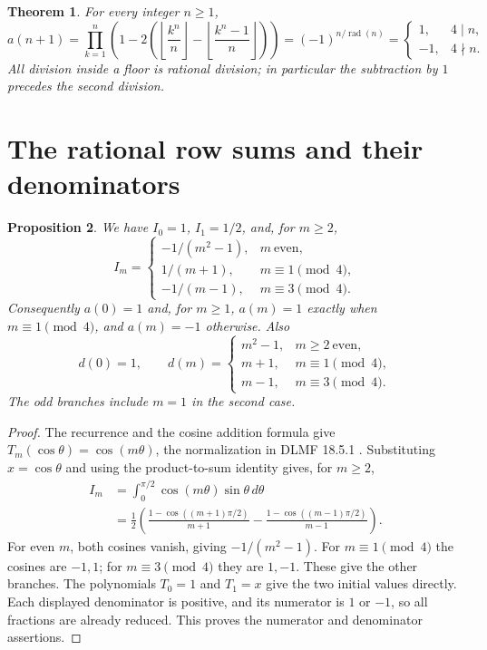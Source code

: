 \documentclass[11pt]{article}
\newtheorem{theorem}{Theorem}
\newtheorem{proposition}[theorem]{Proposition}
\newcommand{\rad}{\operatorname{rad}}
\newcommand{\floor}[1]{\left\lfloor #1\right\rfloor}
\begin{document}
\begin{theorem}\label{thm:main}
For every integer $n\ge1$,
\begin{equation}\label{eq:target}
 a(n+1)=\prod_{k=1}^{n}
 \left(1-2\left(\floor{\frac{k^n}{n}}
                  -\floor{\frac{k^n-1}{n}}\right)\right)
 =(-1)^{n/\rad(n)}
 =\begin{cases}1,&4\mid n,\\-1,&4\nmid n.\end{cases}
\end{equation}
All division inside a floor is rational division; in particular the
subtraction by $1$ precedes the second division.
\end{theorem}

\section{The rational row sums and their denominators}
\begin{proposition}\label{prop:integral}
We have $I_0=1$, $I_1=1/2$, and, for $m\ge2$,
\begin{equation}\label{eq:integral}
 I_m=\begin{cases}
 -1/(m^2-1),&m\ \text{even},\\
 1/(m+1),&m\equiv1\pmod4,\\
 -1/(m-1),&m\equiv3\pmod4.
 \end{cases}
\end{equation}
Consequently $a(0)=1$ and, for $m\ge1$, $a(m)=1$ exactly when
$m\equiv1\pmod4$, and $a(m)=-1$ otherwise. Also
\begin{equation}\label{eq:denominator}
 d(0)=1,\qquad
 d(m)=\begin{cases}
 m^2-1,&m\ge2\ \text{even},\\
 m+1,&m\equiv1\pmod4,\\
 m-1,&m\equiv3\pmod4.
 \end{cases}
\end{equation}
The odd branches include $m=1$ in the second case.
\end{proposition}
\begin{proof}
The recurrence and the cosine addition formula give
$T_m(\cos\theta)=\cos(m\theta)$, the normalization in DLMF
18.5.1 \cite{dlmf}.
Substituting $x=\cos\theta$ and using the product-to-sum identity gives,
for $m\ge2$,
\begin{align*}
 I_m&=\int_0^{\pi/2}\cos(m\theta)\sin\theta\,d\theta\\
 &=\frac12\left(
 \frac{1-\cos((m+1)\pi/2)}{m+1}
 -\frac{1-\cos((m-1)\pi/2)}{m-1}\right).
\end{align*}
For even $m$, both cosines vanish, giving $-1/(m^2-1)$.
For $m\equiv1\pmod4$ the cosines are $-1,1$; for
$m\equiv3\pmod4$ they are $1,-1$. These give the other branches.
The polynomials $T_0=1$ and $T_1=x$ give the two initial values directly.
Each displayed denominator is positive, and its numerator is $1$ or $-1$,
so all fractions are already reduced. This proves the numerator and
denominator assertions.
\end{proof}
\end{document}
